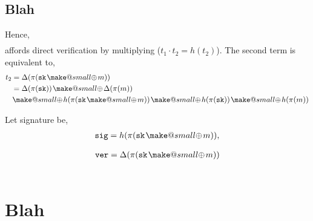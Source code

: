 \documentclass[twocolumn, aps, amsmath, amssymb, nofootinbib, superscriptaddress, longbibliography, doublefloatfix, table-of-contents, eqsecnum, rmp]{revtex4-2}
\makeatletter
\newcommand{\soplus}{{{\hspace{1pt}}{\mathbin{\mathpalette\make@small{\mathbin\oplus}}}}{\hspace{1pt}}}
\newcommand{\make@small}[2]{%
  \vcenter{\hbox{%
    \scalebox{0.6}{$\m@th#1#2$}%
  }}%
}
\makeatother
\begin{document}




\subsection{Blah}

Hence,
\begin{align}
	[h(\pi(\mathtt{sk} \soplus m)), \Delta(\pi(\mathtt{sk} \soplus m))]
\end{align}
affords direct verification by multiplying ($t_1\cdot t_2 = h(t_2)$). The second term is equivalent to,
\begin{align}
	t_2 &= \Delta(\pi(\mathtt{sk} \soplus m)) \nonumber\\
	&= \Delta(\pi(\mathtt{sk})) \soplus \Delta(\pi(m)) \nonumber\\
	&\soplus h(\pi(\mathtt{sk} \soplus m))
 \soplus h(\pi(\mathtt{sk})) \soplus h(\pi(m))
\end{align}


Let signature be,
\begin{align}
	\mathtt{sig} &= h(\pi(\mathtt{sk} \soplus m)),\nonumber\\
\end{align}

\begin{align}
	\mathtt{ver} &= \Delta(\pi(\mathtt{sk} \soplus m)) \nonumber\\
\end{align}

\begin{align}
	[\mathtt{sig}, \mathtt{ver}]
\end{align}


\section{Blah}
\end{document}

